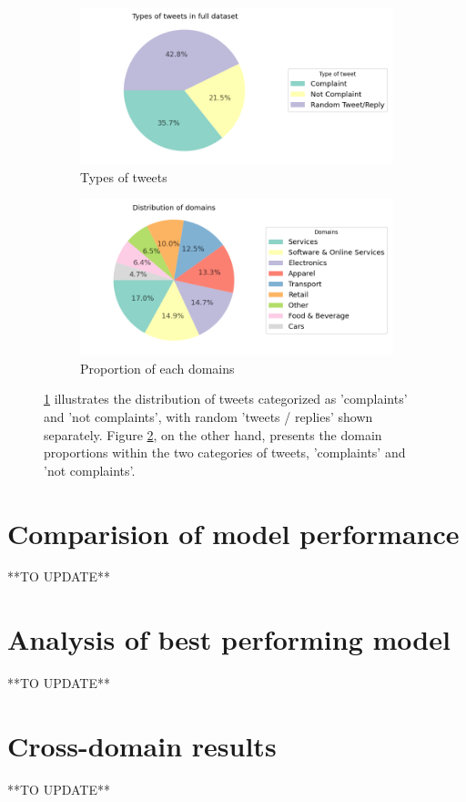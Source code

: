 \begin{figure}[htbp]
    \centering
    \captionsetup{font=small}
    \begin{subfigure}{0.49\textwidth}
        \centering
        \includegraphics[width=\linewidth]{figures/compl_non_random_dist.png}
        \caption{Types of tweets}
        \label{fig: compl_non_random_dist}
    \end{subfigure}
    \hfill
    \begin{subfigure}{0.49\textwidth}
        \centering
        \includegraphics[width=\linewidth]{figures/domain_dist.png}
        \caption{Proportion of each domains}
        \label{fig: domain_dist}
    \end{subfigure}
    \caption{ \ref{fig: compl_non_random_dist} illustrates the distribution of tweets categorized as 'complaints' and 'not complaints', with random 'tweets / replies' shown separately. Figure \ref{fig: domain_dist}, on the other hand, presents the domain proportions within the two categories of tweets, 'complaints' and 'not complaints'.}
    \label{fig: compl_main_dist}
\end{figure}



\section{Comparision of model performance}
**TO UPDATE**

\section{Analysis of best performing model}
**TO UPDATE**

\section{Cross-domain results}
**TO UPDATE**